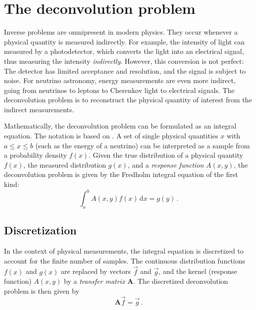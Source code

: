 \section{The deconvolution problem} %
Inverse problems are omnipresent in modern physics.
They occur whenever a physical quantity is measured indirectly.
For example,
the intensity of light can measured by a photodetector,
  which converts the light into an electrical signal,
    thus measuring the intensity \emph{indirectly}.
However,
this conversion is not perfect:
The detector has limited acceptance and resolution,
and the signal is subject to noise.
For neutrino astronomy,
  energy measurements are even more indirect,
    going from neutrinos to leptons to Cherenkov light to electrical signals.
%
The deconvolution problem is to reconstruct the physical quantity of interest
  from the indirect measurements.

Mathematically,
the deconvolution problem can be formulated as an integral equation.
%
The notation is based on \citeauthor{deconvolution_blobel} \cite{deconvolution_blobel}.
A set of single physical quantities $x$
  with $a \leq x \leq b$ %
  (such as the energy of a neutrino)
can be interpreted as a sample from a probability density $f(x)$.
%
Given
  the true distribution of a physical quantity $f(x)$,
  the measured distribution $g(x)$,
  and a \emph{response function} $A(x, y)$,
the deconvolution problem is given by
the Fredholm integral equation of the first kind: \cite{deconvolution_blobel}
\begin{equation}
  \label{eq:deconvolution_problem:fredholm}
  \int_a^b A(x, y) f(x) \, \mathrm{d}x = g(y) \, .
\end{equation}


\subsection{Discretization}
In the context of physical measurements,
the integral equation is discretized
  to account for the finite number of samples.
The continuous distribution functions $f(x)$ and $g(x)$ are replaced by vectors $\vec{f}$ and $\vec{g}$,
and the kernel (response function) $A(x, y)$ by a \emph{transfer matrix} $\symbf{A}$.
%
The discretized deconvolution problem is then given by
\begin{equation}
  \label{eq:deconvolution_problem:discretized}
  \symbf{A} \vec{f} = \vec{g} \, .
\end{equation}

